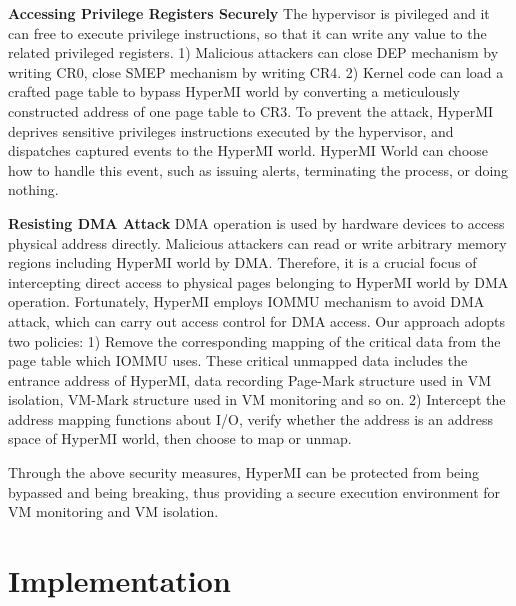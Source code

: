 \documentclass[conference]{IEEEtran}
\begin{document}
\fi

\textbf{Accessing Privilege Registers Securely}
The hypervisor is pivileged and it can free to execute privilege instructions, so that it can write any value to the related privileged registers. 1) Malicious attackers can close DEP mechanism by writing CR0, close SMEP mechanism by writing CR4. 2) Kernel code can load a crafted page table to bypass HyperMI world by converting a meticulously constructed address of one page table to CR3.
To prevent the attack, HyperMI deprives sensitive privileges instructions executed by the hypervisor, and dispatches captured events to the HyperMI world. HyperMI World can choose how to handle this event, such as issuing alerts, terminating the process, or doing nothing. 

\textbf{Resisting DMA Attack}
DMA operation is used by hardware devices to access physical address directly. Malicious attackers can read or write arbitrary memory regions including HyperMI world by DMA. Therefore, it is a crucial focus of intercepting direct access to physical pages belonging to HyperMI world by DMA operation. 
Fortunately, HyperMI employs IOMMU mechanism to avoid DMA attack, which can carry out access control for DMA access. Our approach adopts two policies: 1) Remove the corresponding mapping of the critical data from the page table which IOMMU uses. These critical unmapped data includes the entrance address of HyperMI, data recording Page-Mark structure used in VM isolation, VM-Mark structure used in VM monitoring and so on. 2) Intercept the address mapping functions about I/O, verify whether the address is an address space of HyperMI world, then choose to map or unmap.


Through the above security measures, HyperMI can be protected from being bypassed and being breaking, thus providing a secure execution environment for VM monitoring and VM isolation.




















\iffalse
\section{Implementation}\label{sec:imp}
\end{document}
